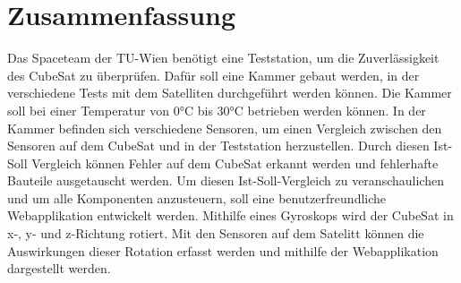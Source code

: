
\section{Zusammenfassung}
{Das Spaceteam der TU-Wien benötigt eine Teststation, um die Zuverlässigkeit des CubeSat zu überprüfen. Dafür soll eine Kammer gebaut werden, in der verschiedene Tests mit dem Satelliten durchgeführt werden können. Die Kammer soll bei einer Temperatur von 0°C bis 30°C betrieben werden können. In der Kammer befinden sich verschiedene Sensoren, um einen Vergleich zwischen den Sensoren auf dem CubeSat und in der Teststation herzustellen. Durch diesen Ist-Soll Vergleich können Fehler auf dem CubeSat erkannt werden und fehlerhafte Bauteile ausgetauscht werden. Um diesen Ist-Soll-Vergleich zu veranschaulichen und um alle Komponenten anzusteuern, soll eine benutzerfreundliche Webapplikation entwickelt werden. Mithilfe eines Gyroskops wird der CubeSat in x-, y- und z-Richtung rotiert. Mit den Sensoren auf dem Satelitt können die Auswirkungen dieser Rotation erfasst werden und mithilfe der Webapplikation dargestellt werden.}